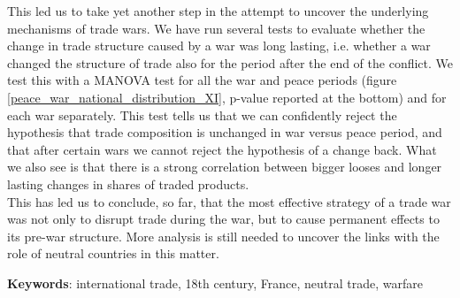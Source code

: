 \documentclass[12pt,a4paper,notitlepage]{article}
\begin{document}
This led us to take yet another step in the attempt to uncover the underlying mechanisms of trade wars. We have run several tests to evaluate whether the change in trade structure caused by a war was long lasting, i.e. whether a war changed the structure of trade also for the period after the end of the conflict. We test this with a MANOVA test for all the war and peace periods (figure \ref{peace_war_national_distribution_XI}, p-value reported at the bottom) and for each war separately. This test tells us that we can confidently reject the hypothesis that trade composition is unchanged in war versus peace period, and that after certain wars we cannot reject the hypothesis of a change back. What we also see is that there is a strong correlation between bigger looses and longer lasting changes in shares of traded products. \\
This has led us to conclude, so far, that the most effective strategy of a trade war was not only to disrupt trade during the war, but to cause permanent effects to its pre-war structure. More analysis is still needed to uncover the links with the role of neutral countries in this matter.





\textbf{Keywords}: international trade, 18th century, France, neutral trade, warfare


\renewcommand{\baselinestretch}{1.0}\normalsize


\end{document}
